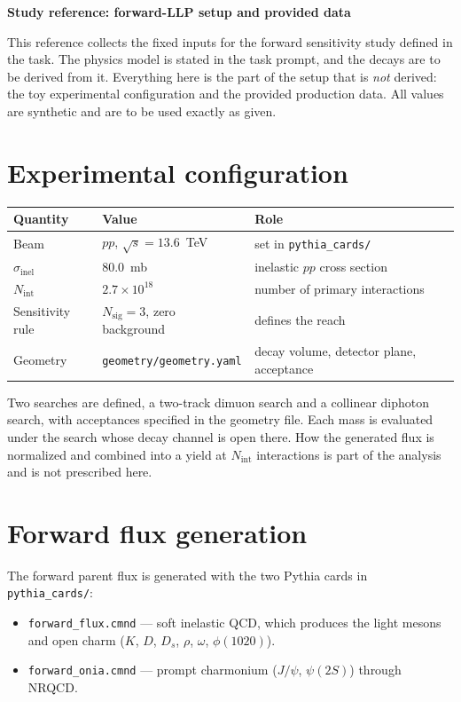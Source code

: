 \documentclass[11pt]{article}
\begin{document}
\begin{center}
{\large\bfseries Study reference: forward-LLP setup and provided data}
\end{center}

\author{Tony Menzo}

\noindent
This reference collects the fixed inputs for the forward sensitivity study
defined in the task. The physics model is stated in the task prompt, and the
decays are to be derived from it. Everything here is the part of the setup that
is \emph{not} derived: the toy experimental configuration and the provided
production data. All values are synthetic and are to be used exactly as given.

\section*{Experimental configuration}

\begin{center}
\begin{tabular}{@{}lll@{}}
\toprule
Quantity & Value & Role \\
\midrule
Beam & $pp$, $\sqrt{s} = 13.6$~TeV & set in \texttt{pythia\_cards/} \\
$\sigma_{\mathrm{inel}}$ & $80.0$~mb & inelastic $pp$ cross section \\
$N_{\mathrm{int}}$ & $2.7\times10^{18}$ & number of primary interactions \\
Sensitivity rule & $N_{\mathrm{sig}} = 3$, zero background & defines the reach \\
Geometry & \texttt{geometry/geometry.yaml} & decay volume, detector plane, acceptance \\
\bottomrule
\end{tabular}
\end{center}

\noindent
Two searches are defined, a two-track dimuon search and a collinear diphoton
search, with acceptances specified in the geometry file. Each mass is evaluated
under the search whose decay channel is open there. How the generated flux is
normalized and combined into a yield at $N_{\mathrm{int}}$ interactions is part
of the analysis and is not prescribed here.

\section*{Forward flux generation}

The forward parent flux is generated with the two Pythia cards in
\texttt{pythia\_cards/}:
\begin{itemize}
\item \texttt{forward\_flux.cmnd} --- soft inelastic QCD, which produces the
  light mesons and open charm ($K$, $D$, $D_s$, $\rho$, $\omega$, $\phi(1020)$).
\item \texttt{forward\_onia.cmnd} --- prompt charmonium ($J/\psi$, $\psi(2S)$)
  through NRQCD.
\end{itemize}
\end{document}
